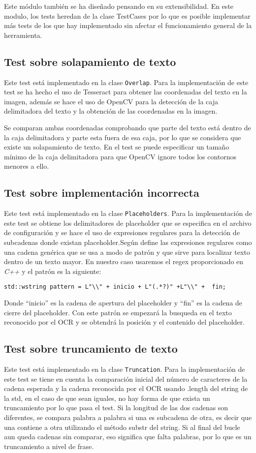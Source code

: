 Este módulo también se ha diseñado pensando en su extensibilidad.
En este modulo, los tests heredan de la clase TestCases por lo que es posible implementar más tests de los que hay implementado sin afectar el funcionamiento general de la herramienta.
\subsection{Test sobre solapamiento de texto}
Este test está implementado en la clase \texttt{Overlap}.
Para la implementación de este test se ha hecho el uso de Tesseract para obtener las coordenadas del texto en la imagen, además se hace el uso de OpenCV para la detección de la caja delimitadora del texto y la obtención de las coordenadas en la imagen.

Se comparan ambas coordenadas comprobando que parte del texto está dentro de la caja delimitadora y parte esta fuera de esa caja, por lo que se considera que existe un solapamiento de texto. En el test se puede especificar un tamaño mínimo de la caja delimitadora para que OpenCV ignore todos los contornos menores a ello. 
\subsection{Test sobre implementación incorrecta}
Este test está implementado en la clase \texttt{Placeholders}.
Para la implementación de este test se obtiene los delimitadores de placeholder que se especifica en el archivo de configuración y se hace el uso de expresiones regulares para la detección de subcadenas donde existan placeholder.Según \cite{Regex} define las expresiones regulares como una cadena genérica que se usa a modo de patrón y que sirve para localizar texto dentro de un texto mayor. En nuestro caso usaremos el regex proporcionado en \emph{C++} y el patrón es la siguiente:

\verb|std::wstring pattern = L"\\" + inicio + L"(.*?)" +L"\\" +  fin;|

Donde ``inicio'' es la cadena de apertura del placeholder y ``fin'' es la cadena de cierre del placeholder. 
Con este patrón se empezará la busqueda en el texto reconocido por el OCR y se obtendrá la posición y el contenido del placeholder.


\subsection{Test sobre truncamiento de texto}
Este test está implementado en la clase \texttt{Truncation}.
Para la implementación de este test se tiene en cuenta la comparación inicial del número de caracteres de la cadena esperada y la cadena reconocida por el OCR usando .length del string de la std, en el caso de que sean iguales, no hay forma de que exista un truncamiento por lo que pasa el test.
Si la longitud de las dos cadenas son diferentes, se compara palabra a palabra si una es subcadena de otra, es decir que una contiene a otra utilizando el método substr del string.
Si al final del bucle aun queda cadenas sin comparar, eso significa que falta palabras, por lo que es un truncamiento a nivel de frase.

